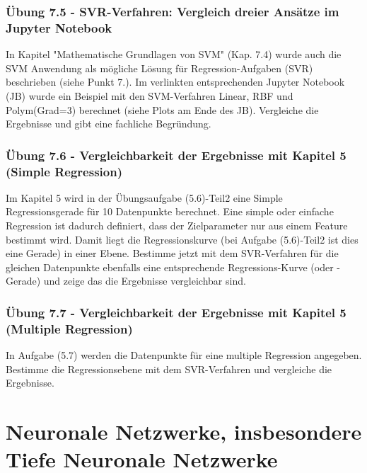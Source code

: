 \documentclass[12pt]{article}
\begin{document}
\subsubsection{Übung 7.5 - SVR-Verfahren: Vergleich dreier Ansätze im Jupyter Notebook} 
%
In Kapitel "Mathematische Grundlagen von SVM" (Kap. 7.4) wurde auch die SVM Anwendung als mögliche Lösung für Regression-Aufgaben (SVR) beschrieben (siehe Punkt 7.). Im verlinkten entsprechenden Jupyter Notebook (JB) wurde ein Beispiel mit den SVM-Verfahren Linear, RBF und Polym(Grad=3) berechnet (siehe Plots am Ende des JB). Vergleiche die Ergebnisse und gibt eine fachliche Begründung.

\subsubsection{Übung 7.6 - Vergleichbarkeit der Ergebnisse mit Kapitel 5 (Simple Regression)} 
%
Im Kapitel 5 wird in der Übungsaufgabe (5.6)-Teil2  eine Simple  Regressionsgerade für 10 Datenpunkte berechnet. Eine simple oder einfache Regression ist dadurch definiert, dass der Zielparameter nur aus einem Feature bestimmt wird. Damit liegt die Regressionskurve (bei Aufgabe (5.6)-Teil2 ist dies eine Gerade) in einer Ebene. Bestimme jetzt mit dem SVR-Verfahren für die gleichen Datenpunkte ebenfalls eine entsprechende Regressions-Kurve (oder -Gerade) und zeige das die Ergebnisse vergleichbar sind.
%
\subsubsection{Übung 7.7 - Vergleichbarkeit der Ergebnisse mit Kapitel 5 (Multiple Regression)}
%
In Aufgabe (5.7) werden die Datenpunkte für eine multiple Regression angegeben. Bestimme die Regressionsebene mit dem SVR-Verfahren und vergleiche die Ergebnisse. 
 
\newpage

\section{Neuronale Netzwerke, insbesondere Tiefe Neuronale Netzwerke }
\end{document}
